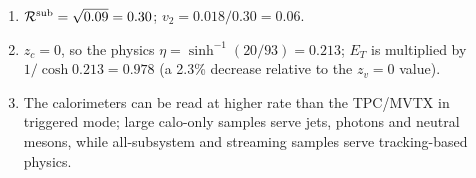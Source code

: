 \documentclass[11pt,letterpaper]{article}
\begin{document}
\begin{enumerate}[label=A\arabic*.]
\item $\mathcal R^{\rm sub}=\sqrt{0.09}=0.30$; $v_2=0.018/0.30=0.06$.
\item $z_c=0$, so the physics $\eta=\sinh^{-1}(20/93)=0.213$; $E_T$ is multiplied by $1/\cosh0.213=0.978$ (a 2.3\% decrease relative to the $z_v=0$ value).
\item The calorimeters can be read at higher rate than the TPC/MVTX in triggered mode; large calo-only samples serve jets, photons
and neutral mesons, while all-subsystem and streaming samples serve tracking-based physics.
\end{enumerate}
\end{document}
